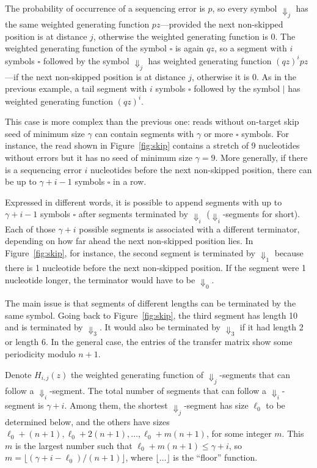 \documentclass{article}
\begin{document}
The probability of occurrence of a sequencing error is $p$, so every
symbol $\Downarrow_j$ has the same weighted generating function
$pz$---provided the next non-skipped position is at distance $j$,
otherwise the weighted generating function is 0. The weighted generating
function of the symbol $\square$ is again $qz$, so a segment with $i$
symbols $\square$ followed by the symbol $\Downarrow_j$ has weighted
generating function $(qz)^ipz$---if the next non-skipped position is at
distance $j$, otherwise it is 0. As in the previous example, a tail
segment with $i$ symbols $\square$ followed by the symbol $|$ has weighted
generating function $(qz)^i$.

This case is more complex than the previous one: reads without on-target
skip seed of minimum size $\gamma$ can contain segments with $\gamma$ or
more $\square$ symbols. For instance, the read shown in
Figure~\ref{fig:skip} contains a stretch of 9 nucleotides without errors
but it has no seed of minimum size $\gamma=9$. More generally, if there is
a sequencing error $i$ nucleotides before the next non-skipped position,
there can be up to $\gamma+i-1$ symbols $\square$ in a row.

Expressed in different words, it is possible to append segments with up to
$\gamma+i-1$ symbols $\square$ after segments terminated by $\Downarrow_i$
($\Downarrow_i$-segments for short). Each of those $\gamma+i$ possible
segments is associated with a different terminator, depending on how far
ahead the next non-skipped position lies. In Figure~\ref{fig:skip}, for
instance, the second segment is terminated by $\Downarrow_1$ because there
is 1 nucleotide before the next non-skipped position. If the segment were
1 nucleotide longer, the terminator would have to be $\Downarrow_0$.

The main issue is that segments of different lengths can be terminated by
the same symbol. Going back to Figure~\ref{fig:skip}, the third segment
has length 10 and is terminated by $\Downarrow_3$. It would also be
terminated by $\Downarrow_3$ if it had length 2 or length 6. In the
general case, the entries of the transfer matrix show some periodicity
modulo $n+1$.

Denote $H_{i,j}(z)$ the weighted generating function of
$\Downarrow_j$-segments that can follow a $\Downarrow_i$-segment. The
total number of segments that can follow a $\Downarrow_i$-segment is
$\gamma+i$. Among them, the shortest $\Downarrow_j$-segment has size
$\ell_0$ to be determined below, and the others have sizes $\ell_0+(n+1),
\ell_0+2(n+1), \ldots, \ell_0+m(n+1)$, for some integer $m$. This $m$ is
the largest number such that $\ell_0+m(n+1) \leq \gamma+i$, so $m =
\lfloor (\gamma+i-\ell_0)/(n+1)\rfloor$, where $\lfloor \ldots \rfloor$ is
the ``floor'' function.
\end{document}

